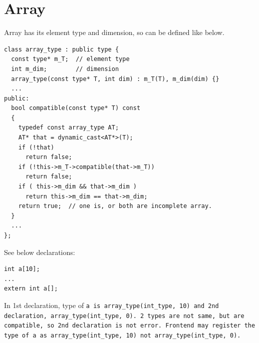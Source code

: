 \section{Array}

Array has its element type and dimension, so can be defined like below.

\begin{verbatim}
class array_type : public type {
  const type* m_T;  // element type
  int m_dim;        // dimension
  array_type(const type* T, int dim) : m_T(T), m_dim(dim) {}
  ...
public:
  bool compatible(const type* T) const
  {
    typedef const array_type AT;
    AT* that = dynamic_cast<AT*>(T);
    if (!that)
      return false;
    if (!this->m_T->compatible(that->m_T))
      return false;
    if ( this->m_dim && that->m_dim )
      return this->m_dim == that->m_dim;
    return true;  // one is, or both are incomplete array.
  }
  ...
};
\end{verbatim}
See below declarations:
\begin{verbatim}
int a[10];
...
extern int a[];
\end{verbatim}
In 1st declaration, type of \tt{a} is
\tt{array\_type(int\_type, 10)} and 2nd declaration,
\tt{array\_type(int\_type, 0)}. 2 types are not
same, but are compatible, so 2nd declaration is
not error. Frontend may register the type of \tt{a}
as \tt{array\_type(int\_type, 10)} not
\tt{array\_type(int\_type, 0)}.

